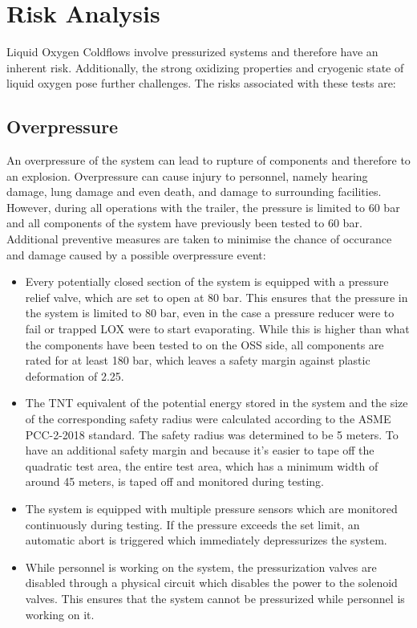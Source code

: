 \documentclass{article}
\begin{document}
\section{Risk Analysis}
Liquid Oxygen Coldflows involve pressurized systems and therefore have an inherent risk. Additionally, the strong oxidizing properties and cryogenic state of liquid oxygen pose further challenges. The risks associated with these tests are:
\subsection{Overpressure}
An overpressure of the system can lead to rupture of components and therefore to an explosion. Overpressure can cause injury to personnel, namely hearing damage, lung damage and even death, and damage to surrounding facilities. However, during all operations with the trailer, the pressure is limited to 60 bar and all components of the system have previously been tested to 60 bar. Additional preventive measures are taken to minimise the chance of occurance and damage caused by a possible overpressure event:
\begin{itemize}
    \item Every potentially closed section of the system is equipped with a pressure relief valve, which are set to open at 80 bar. This ensures that the pressure in the system is limited to 80 bar, even in the case a pressure reducer were to fail or trapped LOX were to start evaporating. While this is higher than what the components have been tested to on the OSS side, all components are rated for at least 180 bar, which leaves a safety margin against plastic deformation of 2.25.
    \item The TNT equivalent of the potential energy stored in the system and the size of the corresponding safety radius were calculated according to the ASME PCC-2-2018 standard. The safety radius was determined to be 5 meters. To have an additional safety margin and because it's easier to tape off the quadratic test area, the entire test area, which has a minimum width of around 45 meters, is taped off and monitored during testing.
    \item The system is equipped with multiple pressure sensors which are monitored continuously during testing. If the pressure exceeds the set limit, an automatic abort is triggered which immediately depressurizes the system.
    \item While personnel is working on the system, the pressurization valves are disabled through a physical circuit which disables the power to the solenoid valves. This ensures that the system cannot be pressurized while personnel is working on it.
\end{itemize}
\end{document}
